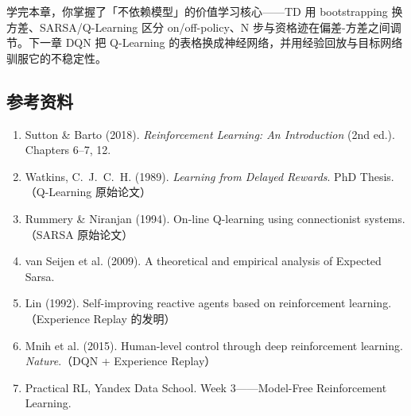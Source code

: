\documentclass{article}
\begin{document}
学完本章，你掌握了「不依赖模型」的价值学习核心——TD 用 bootstrapping 换方差、SARSA/Q-Learning 区分 on/off-policy、N 步与资格迹在偏差-方差之间调节。下一章 DQN 把 Q-Learning 的表格换成神经网络，并用经验回放与目标网络驯服它的不稳定性。

\subsection*{参考资料}

\begin{enumerate}
  \item Sutton \& Barto (2018). \textit{Reinforcement Learning: An Introduction} (2nd ed.). Chapters 6--7, 12.
  \item Watkins, C.\ J.\ C.\ H. (1989). \textit{Learning from Delayed Rewards}. PhD Thesis.（Q-Learning 原始论文）
  \item Rummery \& Niranjan (1994). On-line Q-learning using connectionist systems.（SARSA 原始论文）
  \item van Seijen et al. (2009). A theoretical and empirical analysis of Expected Sarsa.
  \item Lin (1992). Self-improving reactive agents based on reinforcement learning.（Experience Replay 的发明）
  \item Mnih et al. (2015). Human-level control through deep reinforcement learning. \textit{Nature}.（DQN + Experience Replay）
  \item Practical RL, Yandex Data School. Week 3——Model-Free Reinforcement Learning.
\end{enumerate}
\end{document}
